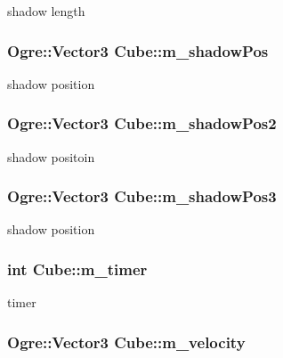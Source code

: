 shadow length \hypertarget{class_cube_a5b6c34989a238006fb3df95debbb5b61}{
\subsubsection[{m\-\_\-shadow\-Pos}]{\setlength{\rightskip}{0pt plus 5cm}Ogre\-::\-Vector3 Cube\-::m\-\_\-shadow\-Pos}}\label{class_cube_a5b6c34989a238006fb3df95debbb5b61}
shadow position \hypertarget{class_cube_a2c7d96e22d8bf8fe5b1da82b4a919b1f}{
\subsubsection[{m\-\_\-shadow\-Pos2}]{\setlength{\rightskip}{0pt plus 5cm}Ogre\-::\-Vector3 Cube\-::m\-\_\-shadow\-Pos2}}\label{class_cube_a2c7d96e22d8bf8fe5b1da82b4a919b1f}
shadow positoin \hypertarget{class_cube_a3640e2093c74415355ca18c676ce55d3}{
\subsubsection[{m\-\_\-shadow\-Pos3}]{\setlength{\rightskip}{0pt plus 5cm}Ogre\-::\-Vector3 Cube\-::m\-\_\-shadow\-Pos3}}\label{class_cube_a3640e2093c74415355ca18c676ce55d3}
shadow position \hypertarget{class_cube_a7500a909cbc9f7f57056ce30d578b2f2}{
\subsubsection[{m\-\_\-timer}]{\setlength{\rightskip}{0pt plus 5cm}int Cube\-::m\-\_\-timer}}\label{class_cube_a7500a909cbc9f7f57056ce30d578b2f2}
timer \hypertarget{class_cube_a516fe89321f3e9929f46b1c110abaca9}{
\subsubsection[{m\-\_\-velocity}]{\setlength{\rightskip}{0pt plus 5cm}Ogre\-::\-Vector3 Cube\-::m\-\_\-velocity\hspace{0.3cm}{\ttfamily [private]}}}\label{class_cube_a516fe89321f3e9929f46b1c110abaca9}
